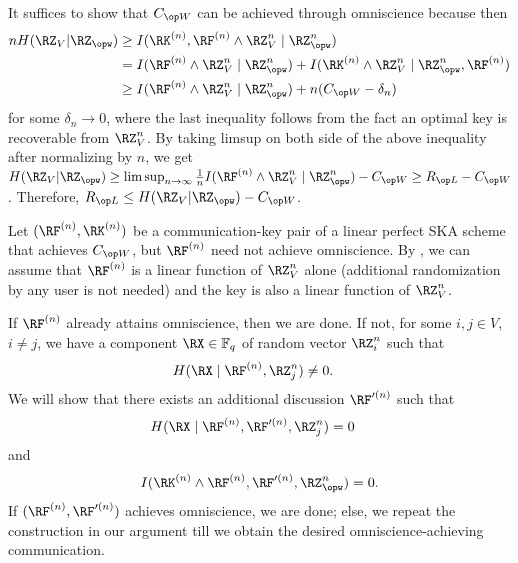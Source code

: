 It suffices to show that $\wskc$ can be achieved through omniscience because then
\begin{align*}
    nH(\RZ_V|\RZ_{\opw})&\geq I(\RK^{(n)},\RF^{(n)} \wedge \RZ_V^n \mid \RZ_{\opw}^n)\\
                        & = I(\RF^{(n)} \wedge \RZ_V^n \mid \RZ_{\opw}^n)+I(\RK^{(n)} \wedge \RZ_V^n \mid \RZ_{\opw}^n,\RF^{(n)})\\
                        & \geq I(\RF^{(n)} \wedge \RZ_V^n \mid \RZ_{\opw}^n) + n(\wskc-\delta_n) 
\end{align*}
for some $\delta_n \to 0$, where the last inequality follows from the fact an optimal key is recoverable from $\RZ_V^n$. By taking limsup on both side of the above inequality after normalizing by $n$, we get $ H(\RZ_V|\RZ_{\opw})\geq \limsup_{n \to \infty}\frac{1}{n}I(\RF^{(n)} \wedge \RZ_V^n \mid \RZ_{\opw}^n)  - \wskc \geq \rl- \wskc$. Therefore, $\rl \leq H(\RZ_V|\RZ_{\opw}) -\wskc$.



Let $(\RF^{(n)}, \RK^{(n)})$ be a communication-key pair of a linear perfect SKA scheme that achieves $\wskc$, but $\RF^{(n)}$ need not achieve omniscience. By  \cite[Theorem~1]{chan19oneshot}, we can assume that $\RF^{(n)}$ is a linear function of $\RZ_V^n$ alone (additional randomization by any user is not needed) and the key is also a linear function of $\RZ_V^n$. 

If $\RF^{(n)}$ already attains omniscience, then we are done. If not, for some $i,j \in V$, $i \ne j$, we have a component $\RX \in \Fq$ of random vector $\RZ_i^{n}$ such that
\begin{align*}
    H(\RX \mid \RF^{(n)}, \RZ_j^n) &\neq 0.
\end{align*}
We will show that there exists an additional discussion $\RF'^{(n)}$ such that
\begin{align}
    H(\RX \mid \RF^{(n)},\RF'^{(n)}, \RZ_j^n) &= 0 \label{eq:additional_recov}
\end{align}  and 
\begin{align}
 I(\RK^{(n)} \wedge \RF^{(n)},\RF'^{(n)}, \RZ_{\opw}^n) = 0.\label{eq:additional_secrecy}
\end{align}
If $(\RF^{(n)},\RF'^{(n)})$ achieves omniscience, we are done; else, we repeat the construction in our argument till we obtain the desired omniscience-achieving communication.

